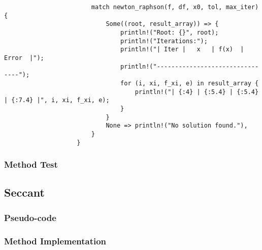 \documentclass{article}
\begin{document}
\begin{verbatim}
                        match newton_raphson(f, df, x0, tol, max_iter) {
                            Some((root, result_array)) => {
                                println!("Root: {}", root);
                                println!("Iterations:");
                                println!("| Iter |   x   | f(x)  | Error  |");
                                println!("--------------------------------");
                                for (i, xi, f_xi, e) in result_array {
                                    println!("| {:4} | {:5.4} | {:5.4} | {:7.4} |", i, xi, f_xi, e);
                                }
                            }
                            None => println!("No solution found."),
                        }
                    }
                \end{verbatim}
        \subsubsection{Method Test}

    \subsection{Seccant}
        \subsubsection{Pseudo-code}
        \subsubsection{Method Implementation}
\end{document}
